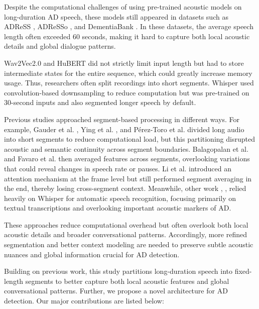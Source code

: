 \documentclass[journal]{IEEEtran}
\begin{document}
Despite the computational challenges of using pre-trained acoustic models on long-duration AD speech, these models still appeared in datasets such as ADReSS \cite{adress}, ADReSSo \cite{adresso}, and DementiaBank \cite{DB}. In these datasets, the average speech length often exceeded 60 seconds, making it hard to capture both local acoustic details and global dialogue patterns.

Wav2Vec2.0 and HuBERT did not strictly limit input length but had to store intermediate states for the entire sequence, which could greatly increase memory usage. Thus, researchers often split recordings into short segments. Whisper used convolution-based downsampling to reduce computation but was pre-trained on 30-second inputs and also segmented longer speech by default.

Previous studies approached segment-based processing in different ways. For example, Gauder et al. \cite{segment-w2v}, Ying et al. \cite{w2v-segement-average1}, and Pérez-Toro et al. \cite{2024-top1} divided long audio into short segments to reduce computational load, but this partitioning disrupted acoustic and semantic continuity across segment boundaries. Balagopalan et al. \cite{w2v-segement-average2} and Favaro et al. \cite{JHU} then averaged features across segments, overlooking variations that could reveal changes in speech rate or pauses. Li et al. \cite{cunk-whipser-encoder} introduced an attention mechanism at the frame level but still performed segment averaging in the end, thereby losing cross-segment context. Meanwhile, other work \cite{asr1}, \cite{asr2}, \cite{asr3} relied heavily on Whisper for automatic speech recognition, focusing primarily on textual transcriptions and overlooking important acoustic markers of AD.

These approaches reduce computational overhead but often overlook both local acoustic details and broader conversational patterns. Accordingly, more refined segmentation and better context modeling are needed to preserve subtle acoustic nuances and global information crucial for AD detection.






Building on previous work, this study partitions long-duration speech into fixed-length segments to better capture both local acoustic features and global conversational patterns. 
Further, we propose a novel architecture for AD detection. Our major contributions are listed below:
\end{document}
